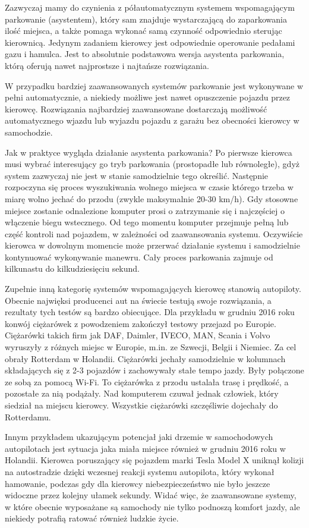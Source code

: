 \documentclass[a4paper,11pt,twoside]{report}
\theoremstyle{definition}
\begin{document}
Zazwyczaj mamy do czynienia z półautomatycznym systemem wspomagającym parkowanie (asystentem), który sam znajduje  wystarczającą do zaparkowania ilość miejsca, a także pomaga wykonać samą czynność odpowiednio sterując kierownicą. Jedynym zadaniem kierowcy jest odpowiednie operowanie pedałami gazu i hamulca. Jest to absolutnie podstawowa wersja asystenta parkowania, którą oferują nawet najprostsze i najtańsze rozwiązania. 


W przypadku bardziej zaawansowanych systemów parkowanie jest wykonywane w pełni automatycznie, a niekiedy możliwe jest nawet opuszczenie pojazdu przez kierowcę. Rozwiązania najbardziej zaawansowane dostarczają możliwość automatycznego wjazdu lub wyjazdu pojazdu z garażu bez obecności kierowcy w samochodzie.

Jak w praktyce wygląda działanie asystenta parkowania? Po pierwsze kierowca musi wybrać interesujący go tryb parkowania (prostopadłe lub równoległe), gdyż system zazwyczaj nie jest w stanie samodzielnie tego określić. Następnie rozpoczyna się proces wyszukiwania wolnego miejsca w czasie którego trzeba w miarę wolno jechać do przodu (zwykle maksymalnie 20-30 km/h). Gdy stosowne miejsce zostanie odnalezione komputer prosi o zatrzymanie się i najczęściej o włączenie biegu wstecznego. Od tego momentu komputer przejmuje pełną lub część kontroli nad pojazdem, w zależności od zaawansowania systemu. Oczywiście kierowca w dowolnym momencie może przerwać działanie systemu i samodzielnie kontynuować wykonywanie manewru. Cały proces parkowania zajmuje od kilkunastu do kilkudziesięciu sekund.

Zupełnie inną kategorię systemów wspomagających kierowcę stanowią autopiloty. Obecnie najwięksi producenci aut na świecie testują swoje rozwiązania, a rezultaty tych testów są bardzo obiecujące. Dla przykładu w grudniu 2016 roku konwój ciężarówek z powodzeniem zakończył testowy przejazd po Europie. Ciężarówki takich firm jak DAF, Daimler, IVECO, MAN, Scania i Volvo wyruszyły z różnych miejsc w Europie, m.in. ze Szwecji, Belgii i Niemiec. Za cel obrały Rotterdam w Holandii. Ciężarówki jechały samodzielnie w kolumnach składających się z 2-3 pojazdów i zachowywały stałe tempo jazdy. Były połączone ze sobą za pomocą Wi-Fi. To ciężarówka z przodu ustalała trasę i prędkość, a pozostałe za nią podążały. Nad komputerem czuwał jednak człowiek, który siedział na miejscu kierowcy. Wszystkie ciężarówki szczęśliwie dojechały do Rotterdamu. 

Innym przykładem ukazującym potencjał jaki drzemie w samochodowych autopilotach jest sytuacja jaka miała miejsce również w grudniu 2016 roku w Holandii. Kierowca poruszający się pojazdem marki Tesla Model X uniknął kolizji na autostradzie dzięki wczesnej reakcji systemu autopilota, który wykonał hamowanie, podczas gdy dla kierowcy niebezpieczeństwo nie było jeszcze widoczne przez kolejny ułamek sekundy. Widać więc, że zaawansowane systemy, w które obecnie wyposażane są samochody nie tylko podnoszą komfort jazdy, ale niekiedy potrafią ratować również ludzkie życie.
\end{document}
